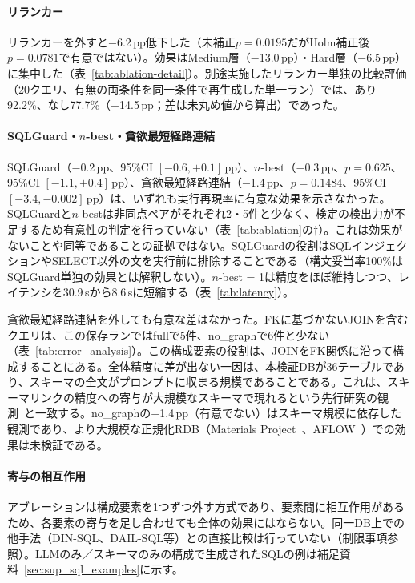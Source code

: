 \documentclass[twocolumn]{interact}
\begin{document}
\paragraph*{リランカー}
リランカーを外すと$-$6.2\,pp低下した（未補正$p=0.0195$だがHolm補正後$p=0.0781$で有意ではない）。効果はMedium層（$-$13.0\,pp）・Hard層（$-$6.5\,pp）に集中した（表~\ref{tab:ablation-detail}）。別途実施したリランカー単独の比較評価（20クエリ、有無の両条件を同一条件で再生成した単一ラン）では、あり92.2\%、なし77.7\%（$+$14.5\,pp；差は未丸め値から算出）であった。

\paragraph*{SQLGuard・$n$-best・貪欲最短経路連結}
SQLGuard（$-$0.2\,pp、95\%CI $[-0.6, +0.1]$\,pp）、$n$-best（$-$0.3\,pp、$p=0.625$、95\%CI $[-1.1, +0.4]$\,pp）、貪欲最短経路連結（$-$1.4\,pp、$p=0.1484$、95\%CI $[-3.4, -0.002]$\,pp）は、いずれも実行再現率に有意な効果を示さなかった。SQLGuardと$n$-bestは非同点ペアがそれぞれ2・5件と少なく、検定の検出力が不足するため有意性の判定を行っていない（表~\ref{tab:ablation}の†）。これは効果がないことや同等であることの証拠ではない。SQLGuardの役割はSQLインジェクションやSELECT以外の文を実行前に排除することである（構文妥当率100\%はSQLGuard単独の効果とは解釈しない）。$n$-best = 1は精度をほぼ維持しつつ、レイテンシを30.9\,sから8.6\,sに短縮する（表~\ref{tab:latency}）。

貪欲最短経路連結を外しても有意な差はなかった。FKに基づかないJOINを含むクエリは、この保存ランではfullで5件、no\_graphで6件と少ない（表~\ref{tab:error_analysis}）。この構成要素の役割は、JOINをFK関係に沿って構成することにある。全体精度に差が出ない一因は、本検証DBが36テーブルであり、スキーマの全文がプロンプトに収まる規模であることである。これは、スキーマリンクの精度への寄与が大規模なスキーマで現れるという先行研究の観測~\cite{maamari2024schema}と一致する。no\_graphの$-$1.4\,pp（有意でない）はスキーマ規模に依存した観測であり、より大規模な正規化RDB（Materials Project~\cite{jain2013mp}、AFLOW~\cite{curtarolo2012aflow}）での効果は未検証である。

\paragraph*{寄与の相互作用}
アブレーションは構成要素を1つずつ外す方式であり、要素間に相互作用があるため、各要素の寄与を足し合わせても全体の効果にはならない。同一DB上での他手法（DIN-SQL、DAIL-SQL等）との直接比較は行っていない（制限事項参照）。LLMのみ／スキーマのみの構成で生成されたSQLの例は補足資料~\ref{sec:sup_sql_examples}に示す。
\end{document}
